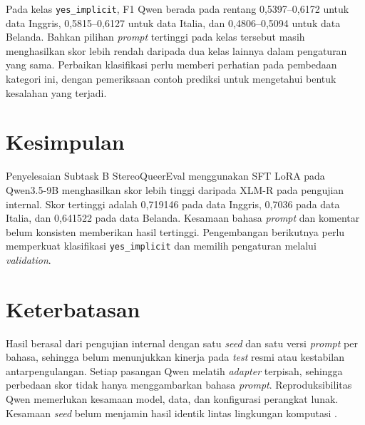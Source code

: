 \documentclass[11pt]{article}
\begin{document}
Pada kelas \texttt{yes\_implicit}, F1 Qwen berada pada rentang 0,5397--0,6172 untuk data Inggris, 0,5815--0,6127 untuk data Italia, dan 0,4806--0,5094 untuk data Belanda. Bahkan pilihan \textit{prompt} tertinggi pada kelas tersebut masih menghasilkan skor lebih rendah daripada dua kelas lainnya dalam pengaturan yang sama. Perbaikan klasifikasi perlu memberi perhatian pada pembedaan kategori ini, dengan pemeriksaan contoh prediksi untuk mengetahui bentuk kesalahan yang terjadi.

\section{Kesimpulan}
Penyelesaian Subtask B StereoQueerEval menggunakan SFT LoRA pada Qwen3.5-9B menghasilkan skor lebih tinggi daripada XLM-R pada pengujian internal. Skor tertinggi adalah 0,719146 pada data Inggris, 0,7036 pada data Italia, dan 0,641522 pada data Belanda. Kesamaan bahasa \textit{prompt} dan komentar belum konsisten memberikan hasil tertinggi. Pengembangan berikutnya perlu memperkuat klasifikasi \texttt{yes\_implicit} dan memilih pengaturan melalui \textit{validation}.

\section*{Keterbatasan}
Hasil berasal dari pengujian internal dengan satu \textit{seed} dan satu versi \textit{prompt} per bahasa, sehingga belum menunjukkan kinerja pada \textit{test} resmi atau kestabilan antarpengulangan. Setiap pasangan Qwen melatih \textit{adapter} terpisah, sehingga perbedaan skor tidak hanya menggambarkan bahasa \textit{prompt}. Reproduksibilitas Qwen memerlukan kesamaan model, data, dan konfigurasi perangkat lunak. Kesamaan \textit{seed} belum menjamin hasil identik lintas lingkungan komputasi \citep{pytorch-reproducibility}.


\end{document}
